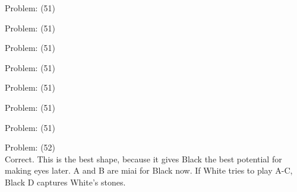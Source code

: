 \documentclass[11pt]{article}
\begin{document}
\begin{minipage}[t]{0.5\textwidth}
  {\centering
  
  Problem: (51)\\
  
  }
\end{minipage}
\begin{minipage}[t]{0.5\textwidth}
  {\centering
  
  Problem: (51)\\
  
  }
\end{minipage}
\begin{minipage}[t]{0.5\textwidth}
  {\centering
  
  Problem: (51)\\
  
  }
\end{minipage}
\begin{minipage}[t]{0.5\textwidth}
  {\centering
  
  Problem: (51)\\
  
  }
\end{minipage}
\begin{minipage}[t]{0.5\textwidth}
  {\centering
  
  Problem: (51)\\
  
  }
\end{minipage}
\begin{minipage}[t]{0.5\textwidth}
  {\centering
  
  Problem: (51)\\
  
  }
\end{minipage}
\begin{minipage}[t]{0.5\textwidth}
  {\centering
  
  Problem: (51)\\
  
  }
\end{minipage}
\begin{minipage}[t]{0.5\textwidth}
  {\centering
  
  Problem: (52)\\
  Correct. This is the best shape, because it gives Black the best potential for making eyes later. A and B are miai for Black now. If White tries to play A-C, Black D captures White's stones.\\
  }
\end{minipage}
\end{document}
